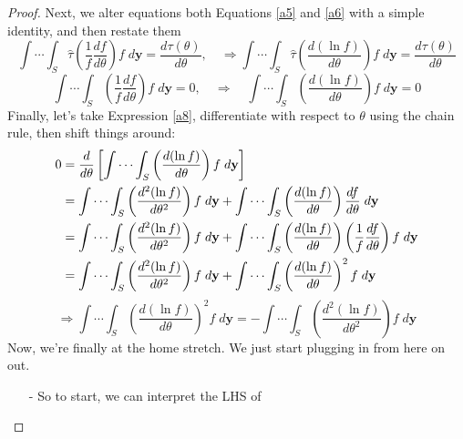\documentclass[a4paper,12pt]{scrartcl}
\begin{document}
\begin{proof}
   Next, we alter equations both Equations \ref{a5} and \ref{a6} with a 
   simple identity, and then restate them
   \begin{equation}
      \label{a7}
      \int \cdots \int_S  \hat{\tau} \left(\frac{1}{f} 
	 \frac{df}{d\theta}\right) f
	 \; d\mathbf{y} = \frac{d\tau(\theta)}{d\theta},\quad\Rightarrow
      \int \cdots \int_S  \hat{\tau} \left(
	 \frac{d(\ln f)}{d\theta}\right) f
	 \; d\mathbf{y} = \frac{d\tau(\theta)}{d\theta} 
   \end{equation}
   \begin{equation}
      \label{a8}
      \int \cdots \int_S \left(\frac{1}{f} 
	 \frac{df}{d\theta}\right) f \; d\mathbf{y} = 0,\quad\Rightarrow
	 \quad	  \int \cdots \int_S  \left(
	 \frac{d(\ln f)}{d\theta}\right) f
	 \; d\mathbf{y} = 0
   \end{equation}
   Finally, let's take Expression \ref{a8}, 
   differentiate with respect to $\theta$ using the chain rule,
   then shift things around:
   \begin{align*}
      0 &= \frac{d}{d\theta}\left[\int \cdots \int_S  \left(
	 \frac{d(\ln f)}{d\theta}\right) f
	 \; d\mathbf{y}\right] \notag \\
      &= \int \cdots \int_S  \left(
	 \frac{d^2(\ln f)}{d\theta^2}\right) f
	 \; d\mathbf{y} + \int \cdots \int_S  \left(
	 \frac{d(\ln f)}{d\theta}\right) \frac{df}{d\theta}
	 \; d\mathbf{y} \notag\\
      &= \int \cdots \int_S  \left(
	 \frac{d^2(\ln f)}{d\theta^2}\right) f
	 \; d\mathbf{y} + \int \cdots \int_S  \left(
	 \frac{d(\ln f)}{d\theta}\right)
	 \left(\frac{1}{f} \frac{df}{d\theta}\right) f
	 \; d\mathbf{y}\notag \\
      &= \int \cdots \int_S  \left(
	 \frac{d^2(\ln f)}{d\theta^2}\right) f
	 \; d\mathbf{y} + \int \cdots \int_S  \left(
	 \frac{d(\ln f)}{d\theta}\right)^2 f
	 \; d\mathbf{y} \notag\\
   \end{align*}
   \begin{equation}
      \label{a9}
      \Rightarrow \int \cdots \int_S  \left(
	 \frac{d(\ln f)}{d\theta}\right)^2 f \; d\mathbf{y}  = 
	 - \int \cdots \int_S  \left(
	 \frac{d^2(\ln f)}{d\theta^2}\right) f \; d\mathbf{y} 
   \end{equation}
   Now, we're finally at the home stretch. We just start plugging
   in from here on out. 
   \begin{itemize}
      \item[-]{So to start, we can interpret the LHS of 
}
\end{itemize}
\end{proof}
\end{document}
